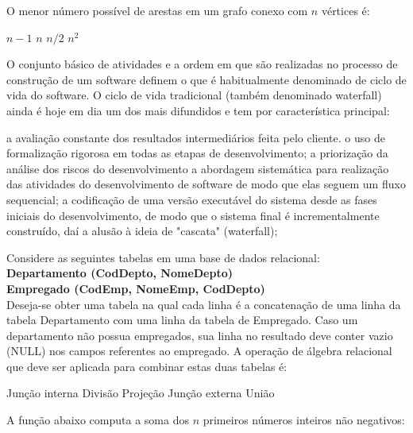 \documentclass[12pt, addpoints]{exam}
\begin{document}
\begin{questions}
\question

O menor número possível de arestas em um grafo conexo com \( n \) vértices é:
\begin{choices}
\choice \( n - 1 \)
\choice \( n \)
\choice \( n/2 \)
\choice \( n^2 \)
\end{choices}

\question

O conjunto básico de atividades e a ordem em que são realizadas no processo de construção de um software definem o que é habitualmente denominado de ciclo de vida do software. O ciclo de vida tradicional (também denominado waterfall) ainda é hoje em dia um dos mais difundidos e tem por característica principal: 
\begin{choices}
\choice a avaliação constante dos resultados intermediários feita pelo cliente.
\choice o uso de formalização rigorosa em todas as etapas de desenvolvimento; 
\choice a priorização da análise dos riscos do desenvolvimento
\choice a abordagem sistemática para realização das atividades do desenvolvimento de software de modo que elas seguem um fluxo sequencial; 
\choice a codificação de uma versão executável do sistema desde as fases iniciais do desenvolvimento, de modo que o sistema final é incrementalmente construído, daí a alusão à ideia de "cascata" (waterfall); 
\end{choices}

\question

Considere as seguintes tabelas em uma base de dados relacional:\\

\textbf{Departamento (CodDepto, NomeDepto)}\\

\textbf{Empregado (CodEmp, NomeEmp, CodDepto)}\\

Deseja-se obter uma tabela na qual cada linha é a concatenação de uma linha da tabela Departamento com uma linha da tabela de Empregado. Caso um departamento não possua empregados, sua linha no resultado deve conter vazio (NULL) nos campos referentes ao empregado. A operação de álgebra relacional que deve ser aplicada para combinar estas duas tabelas é:
\begin{choices}
\choice Junção interna
\choice Divisão
\choice Projeção
\choice Junção externa
\choice União
\end{choices}

\question

A função abaixo computa a soma dos \( n \) primeiros números inteiros não negativos:




\end{questions}
\end{document}
